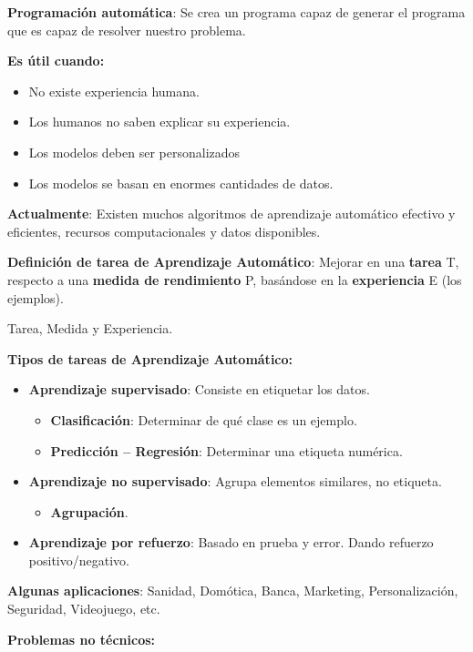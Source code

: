 \documentclass[12pt, twoside, openright]{report} %
\begin{document}
\textbf{Programación automática}: Se crea un programa capaz de generar el programa que es capaz de resolver nuestro problema.

\textbf{Es útil cuando:}

\begin{itemize}
	\item No existe experiencia humana.
	\item Los humanos no saben explicar su experiencia.
	\item Los modelos deben ser personalizados
	\item Los modelos se basan en enormes cantidades de datos.
\end{itemize}

\textbf{Actualmente}: Existen muchos algoritmos de aprendizaje automático efectivo y eficientes, recursos computacionales y datos disponibles.

\textbf{Definición de tarea de Aprendizaje Automático}: Mejorar en una
\textbf{tarea} T, respecto a una \textbf{medida de rendimiento} P, basándose en la \textbf{experiencia} E (los ejemplos).

Tarea, Medida y Experiencia.

\textbf{Tipos de tareas de Aprendizaje Automático:}
\begin{itemize}
	\item \textbf{Aprendizaje supervisado}: Consiste en etiquetar los datos.
	      \begin{itemize}
		      \item \textbf{Clasificación}: Determinar de qué clase es un ejemplo.
		      \item \textbf{Predicción -- Regresión}: Determinar una etiqueta numérica.
	      \end{itemize}
		  \pagebreak
	\item \textbf{Aprendizaje no supervisado}: Agrupa elementos similares, no etiqueta.
	      \begin{itemize}
		      \item \textbf{Agrupación}.
	      \end{itemize}
	\item \textbf{Aprendizaje por refuerzo}: Basado en prueba y error. Dando refuerzo positivo/negativo.
\end{itemize}

\textbf{Algunas aplicaciones}: Sanidad, Domótica, Banca, Marketing, Personalización, Seguridad, Videojuego, etc.

\textbf{Problemas no técnicos:}
\end{document}
